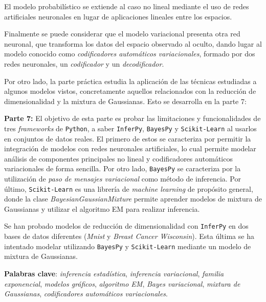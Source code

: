 El modelo probabilístico se extiende al caso no lineal mediante el uso de redes artificiales neuronales en lugar de aplicaciones lineales entre los espacios.

Finalmente se puede considerar que el modelo variacional presenta otra red neuronal, que transforma los datos del espacio observado al oculto, dando lugar al modelo conocido como \emph{codificadores automáticos variacionales}, formado por dos redes neuronales, un \emph{codificador} y un \emph{decodificador}.

Por otro lado, la parte práctica estudia la aplicación de las técnicas estudiadas a algunos modelos vistos, concretamente aquellos relacionados con la reducción de dimensionalidad y la mixtura de Gaussianas. Esto se desarrolla en la parte 7:

\textbf{Parte 7:} El objetivo de esta parte es probar las limitaciones y funcionalidades de tres \textit{frameworks} de \texttt{Python}, a saber \texttt{InferPy}, \texttt{BayesPy} y \texttt{Scikit-Learn} al usarlos en conjuntos de datos reales. El primero de estos se caracteriza por permitir la integración de modelos con redes neuronales artificiales, lo cual permite modelar análisis de componentes principales no lineal y codificadores automáticos variacionales de forma sencilla. Por otro lado, \texttt{BayesPy} se caracteriza por la utilización de \emph{paso de mensajes variacional} como método de inferencia. Por último, \texttt{Scikit-Learn} es una librería de \emph{machine learning} de propósito general, donde la clase \emph{BayesianGaussianMixture} permite aprender modelos de mixtura de Gaussianas y utilizar el algoritmo EM para realizar inferencia.

Se han probado modelos de reducción de dimensionalidad con \texttt{InferPy} en dos bases de datos diferentes (\emph{Mnist} y \emph{Breast Cancer Wisconsin}). Esta última se ha intentado modelar utilizando \texttt{BayesPy} y \texttt{Scikit-Learn} mediante un modelo de mixtura de Gaussianas.

\textbf{Palabras clave}: \emph{inferencia estadística}, \emph{inferencia variacional}, \emph{familia exponencial}, \emph{modelos gráficos}, \emph{algoritmo EM}, \emph{Bayes variacional}, \emph{mixtura de Gaussianas}, \emph{codificadores automáticos variacionales}.
